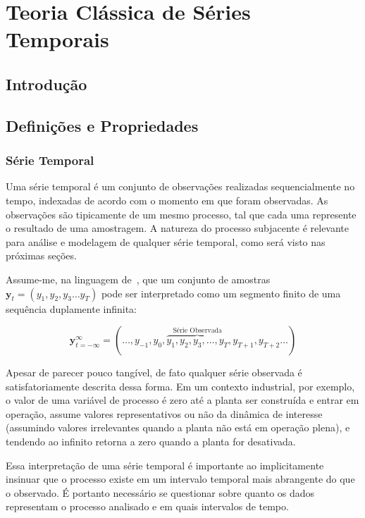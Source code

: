\part{Teoria Clássica de Séries Temporais}
\label{cap:teorica_classica_series_temporais}


\chapter*{Introdução}
\label{sec:teorica_classica_series_temporais_introducao}

\chapter{Definições e Propriedades}
\label{sec:teorica_classica_series_temporais_definicoes}

\section{Série Temporal}\label{ssec:definition}

Uma série temporal é um conjunto de observações realizadas sequencialmente no
tempo, indexadas de acordo com o momento em que foram observadas. As observações
são tipicamente de um mesmo processo, tal que cada uma represente o resultado
de uma amostragem. A natureza do processo subjacente é relevante para análise e
modelagem de qualquer série temporal, como será visto nas próximas seções.

Assume-me, na linguagem de~\cite{hamilton}, que um conjunto de amostras
$\mathbf{y}_t = (y_1, y_2, y_3 \dots y_T)$ pode ser interpretado como um
segmento finito de uma sequência duplamente infinita:

$${\mathbf{y}}_{t=-\infty}^{\infty} = ({\dots, y_{-1},y_0, \overbrace{y_1, y_2, y_3, \dots, y_T}^{\text{Série Observada}}, y_{T+1}, y_{T+2}}\dots)$$

\vspace{1cm}

Apesar de parecer pouco tangível, de fato qualquer série observada é
satisfatoriamente descrita dessa forma. Em um contexto industrial, por exemplo,
o valor de uma variável de processo é zero até a planta ser construída e entrar
em operação, assume valores representativos ou não da dinâmica de interesse
(assumindo valores irrelevantes quando a planta não está em operação plena), e
tendendo ao infinito retorna a zero quando a planta for desativada.

Essa interpretação de uma série temporal é importante ao implicitamente
insinuar que o processo existe em um intervalo temporal mais abrangente do que
o observado. É portanto necessário se questionar sobre quanto os
dados representam o processo analisado e em quais intervalos de tempo.

